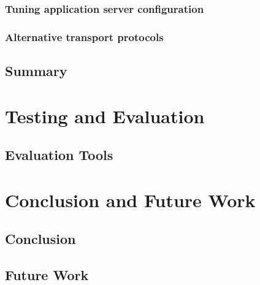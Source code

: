 \documentclass[USenglish]{ifimaster}
\begin{document}
\subsection{Tuning application server configuration}

\subsection{Alternative transport protocols}

\section{Summary}

\chapter{Testing and Evaluation}
\section{Evaluation Tools}

\chapter{Conclusion and Future Work}
\section{Conclusion}

\section{Future Work}

\pagebreak
\printbibliography{}
\printglossary
\end{document}
